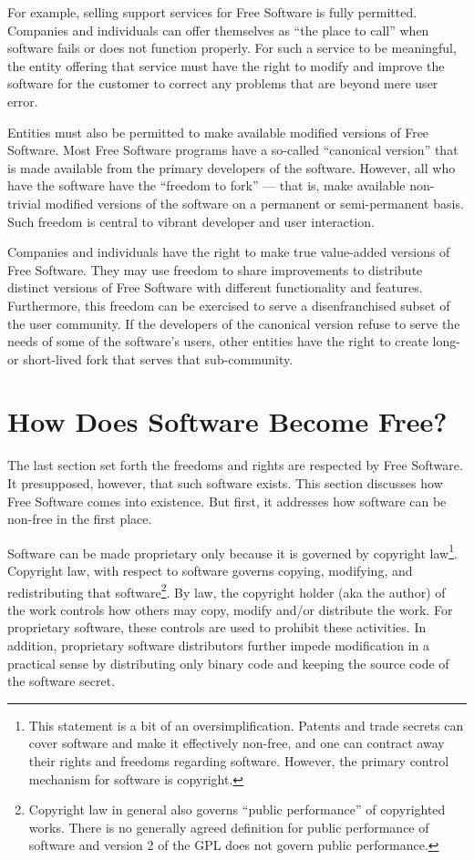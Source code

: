 \documentclass[12pt]{report}
\begin{document}
For example, selling support services for Free Software is fully
permitted.  Companies and individuals can offer themselves as ``the place
to call'' when software fails or does not function properly.  For such a
service to be meaningful, the entity offering that service must have the
right to modify and improve the software for the customer to correct any
problems that are beyond mere user error.

Entities must also be permitted to make available modified versions of
Free Software.  Most Free Software programs have a so-called ``canonical
version'' that is made available from the primary developers of the
software.  However, all who have the software have the ``freedom to fork''
--- that is, make available non-trivial modified versions of the software
on a permanent or semi-permanent basis.  Such freedom is central to
vibrant developer and user interaction.

Companies and individuals have the right to make true value-added versions
of Free Software.  They may use freedom to share improvements to
distribute distinct versions of Free Software with different functionality
and features.  Furthermore, this freedom can be exercised to serve a
disenfranchised subset of the user community.  If the developers of the
canonical version refuse to serve the needs of some of the software's
users, other entities have the right to create long- or short-lived fork
that serves that sub-community.

\section{How Does Software Become Free?}

The last section set forth the freedoms and rights are respected by Free
Software.  It presupposed, however, that such software exists.  This
section discusses how Free Software comes into existence.  But first, it
addresses how software can be non-free in the first place.

Software can be made proprietary only because it is governed by copyright
law\footnote{This statement is a bit of an oversimplification.  Patents
  and trade secrets can cover software and make it effectively non-free,
  and one can contract away their rights and freedoms regarding software.
  However, the primary control mechanism for software is copyright.}.
Copyright law, with respect to software governs copying, modifying, and
redistributing that software\footnote{Copyright law in general also
  governs ``public performance'' of copyrighted works.  There is no
  generally agreed definition for public performance of software and
  version 2 of the GPL does not govern public performance.}.  By law, the
copyright holder (aka the author) of the work controls how others may copy,
modify and/or distribute the work.  For proprietary software, these
controls are used to prohibit these activities.  In addition, proprietary
software distributors further impede modification in a practical sense by
distributing only binary code and keeping the source code of the software
secret.
\end{document}
